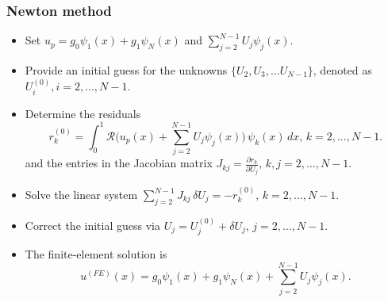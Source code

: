 \documentclass{beamer}
\newcommand{\bi}{\begin{itemize}}
\newcommand{\ei}{\end{itemize}}
\begin{document}
	
	
	
	\begin{frame}
		\frametitle{Newton method}
		\begin{overlayarea}{\textwidth}{\textheight}
			\vspace{-0.5cm}\small	
			\bi
			\item Set $u_p=g_0\psi_1(x)+g_1\psi_N(x)$ and $\sum^{N-1}_{j=2}U_j\psi_j(x)$.
			\item Provide an initial guess for the unknowns $\{U_2,U_3,...U_{N-1}\}$, denoted as $U_i^{(0)}, i=2,...,N-1.$
			\item Determine the residuals $$r_k^{(0)}=\int^1_0\mathcal{R}\Bigg(u_p(x)+\sum^{N-1}_{j=2}U_j\psi_j(x)\Bigg)\,\psi_k(x)\,dx,\, k=2,...,N-1.$$
			and the entries in the Jacobian matrix $J_{kj}=\frac{\partial r_k}{\partial U_j},\, k,j=2,...,N-1.$
			\item Solve the linear system $\sum^{N-1}_{j=2}J_{kj}\,\delta U_j=-r_k^{(0)},\,k=2,...,N-1.$
			\item Correct the initial guess via $U_j=U_j^{(0)}+\delta U_j,\, j=2,...,N-1.$ 
			\item The finite-element solution is\vspace{-0.2cm} $$u^{(FE)}(x)=g_0\psi_1(x)+g_1\psi_N(x)+\sum^{N-1}_{j=2}U_j\psi_j(x).$$
			\ei
		\end{overlayarea}
	\end{frame}
	
\end{document}
